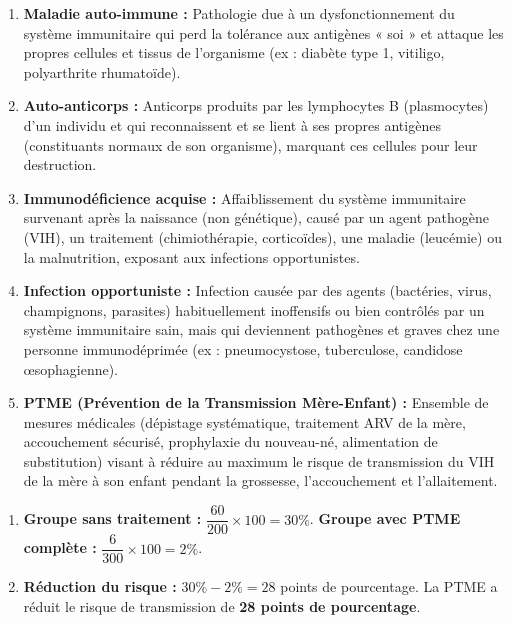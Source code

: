 \documentclass[11pt]{article}
\begin{document}
\begin{corrige}
\begin{enumerate}
\item \textbf{Maladie auto-immune :} Pathologie due à un dysfonctionnement du système immunitaire qui perd la tolérance aux antigènes « soi » et attaque les propres cellules et tissus de l'organisme (ex : diabète type 1, vitiligo, polyarthrite rhumatoïde).
\item \textbf{Auto-anticorps :} Anticorps produits par les lymphocytes B (plasmocytes) d'un individu et qui reconnaissent et se lient à ses propres antigènes (constituants normaux de son organisme), marquant ces cellules pour leur destruction.
\item \textbf{Immunodéficience acquise :} Affaiblissement du système immunitaire survenant après la naissance (non génétique), causé par un agent pathogène (VIH), un traitement (chimiothérapie, corticoïdes), une maladie (leucémie) ou la malnutrition, exposant aux infections opportunistes.
\item \textbf{Infection opportuniste :} Infection causée par des agents (bactéries, virus, champignons, parasites) habituellement inoffensifs ou bien contrôlés par un système immunitaire sain, mais qui deviennent pathogènes et graves chez une personne immunodéprimée (ex : pneumocystose, tuberculose, candidose œsophagienne).
\item \textbf{PTME (Prévention de la Transmission Mère-Enfant) :} Ensemble de mesures médicales (dépistage systématique, traitement ARV de la mère, accouchement sécurisé, prophylaxie du nouveau-né, alimentation de substitution) visant à réduire au maximum le risque de transmission du VIH de la mère à son enfant pendant la grossesse, l'accouchement et l'allaitement.
\end{enumerate}
\end{corrige}

\begin{corrige}
\begin{enumerate}
\item \textbf{Groupe sans traitement :} $\dfrac{60}{200} \times 100 = 30\%$.
\textbf{Groupe avec PTME complète :} $\dfrac{6}{300} \times 100 = 2\%$.
\item \textbf{Réduction du risque :} $30\% - 2\% = 28$ points de pourcentage.
La PTME a réduit le risque de transmission de \textbf{28 points de pourcentage}.
\end{enumerate}
\end{corrige}
\end{document}
